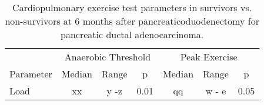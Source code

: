 \begin{table}[p]
	\centering
	\caption{Cardiopulmonary exercise test parameters in survivors vs. non-survivors at 6 months after pancreaticoduodenectomy for pancreatic ductal adenocarcinoma. }
	\label{table:cpet_survival_6months}
	\begin{tabular}{l | c c c | c c c}
		          & \multicolumn{3}{c}{Anaerobic Threshold} & \multicolumn{3}{c}{Peak Exercise} \\
		Parameter & Median & Range & p                      & Median & Range & p                \\ \hline
		Load      & xx     & y -z  & 0.01                   & qq     & w - e & 0.05
	\end{tabular}
\end{table}